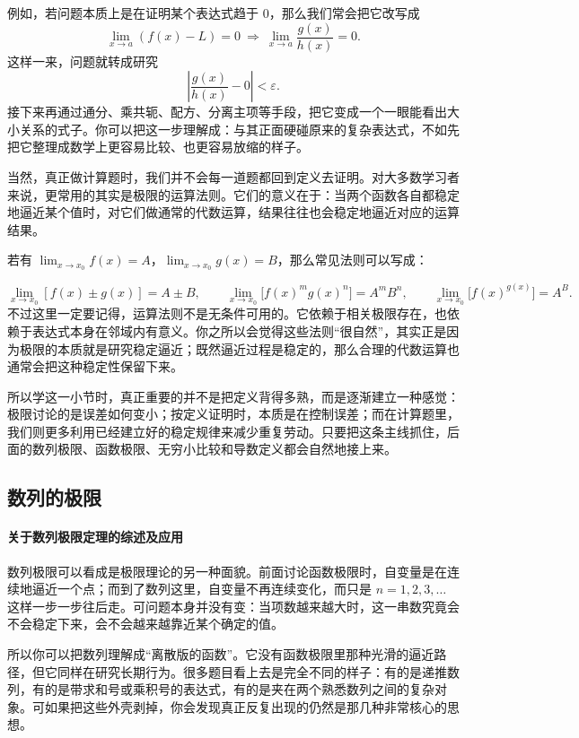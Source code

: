 \documentclass[UTF8]{ctexbook}
\begin{document}
例如，若问题本质上是在证明某个表达式趋于 $0$，那么我们常会把它改写成
\[
\lim_{x\to a}(f(x)-L)=0 \ \Rightarrow\  \lim_{x\to a}\frac{g(x)}{h(x)}=0.
\]
这样一来，问题就转成研究
\[
\left|\frac{g(x)}{h(x)}-0\right|<\varepsilon.
\]
接下来再通过通分、乘共轭、配方、分离主项等手段，把它变成一个一眼能看出大小关系的式子。你可以把这一步理解成：与其正面硬碰原来的复杂表达式，不如先把它整理成数学上更容易比较、也更容易放缩的样子。

当然，真正做计算题时，我们并不会每一道题都回到定义去证明。对大多数学习者来说，更常用的其实是极限的运算法则。它们的意义在于：当两个函数各自都稳定地逼近某个值时，对它们做通常的代数运算，结果往往也会稳定地逼近对应的运算结果。

若有 $\lim_{x\to x_0} f(x)=A$，$\lim_{x\to x_0} g(x)=B$，那么常见法则可以写成：

\[
\lim_{x\to x_0}[f(x)\pm g(x)]=A\pm B,\qquad
\lim_{x\to x_0}\bigl[f(x)^m g(x)^n\bigr]=A^m B^n,\qquad
\lim_{x\to x_0}\bigl[f(x)^{g(x)}\bigr]=A^B.
\]
不过这里一定要记得，运算法则不是无条件可用的。它依赖于相关极限存在，也依赖于表达式本身在邻域内有意义。你之所以会觉得这些法则“很自然”，其实正是因为极限的本质就是研究稳定逼近；既然逼近过程是稳定的，那么合理的代数运算也通常会把这种稳定性保留下来。

所以学这一小节时，真正重要的并不是把定义背得多熟，而是逐渐建立一种感觉：极限讨论的是误差如何变小；按定义证明时，本质是在控制误差；而在计算题里，我们则更多利用已经建立好的稳定规律来减少重复劳动。只要把这条主线抓住，后面的数列极限、函数极限、无穷小比较和导数定义都会自然地接上来。

\subsection{数列的极限}
\paragraph{关于数列极限定理的综述及应用}
数列极限可以看成是极限理论的另一种面貌。前面讨论函数极限时，自变量是在连续地逼近一个点；而到了数列这里，自变量不再连续变化，而只是 $n=1,2,3,\dots$ 这样一步一步往后走。可问题本身并没有变：当项数越来越大时，这一串数究竟会不会稳定下来，会不会越来越靠近某个确定的值。

所以你可以把数列理解成“离散版的函数”。它没有函数极限里那种光滑的逼近路径，但它同样在研究长期行为。很多题目看上去是完全不同的样子：有的是递推数列，有的是带求和号或乘积号的表达式，有的是夹在两个熟悉数列之间的复杂对象。可如果把这些外壳剥掉，你会发现真正反复出现的仍然是那几种非常核心的思想。
\end{document}
